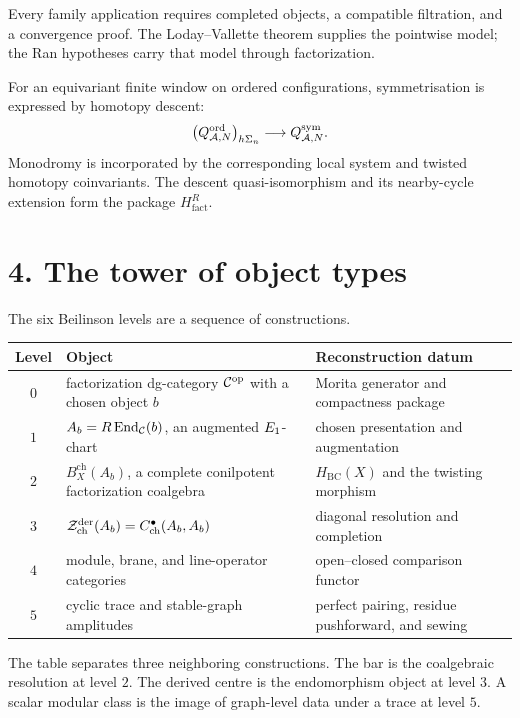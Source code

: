 Every family application requires completed objects, a compatible
filtration, and a convergence proof.  The
Loday--Vallette theorem supplies the pointwise model; the Ran
hypotheses carry that model through factorization.

For an equivariant finite window on ordered configurations,
symmetrisation is expressed by homotopy descent:
\[
 \bigl(Q^{\mathrm{ord}}_{\mathcal{A},N}\bigr)_{h\Sigma_n}
 \longrightarrow Q^{\mathrm{sym}}_{\mathcal{A},N}.
\]
Monodromy is incorporated by the corresponding local system and
twisted homotopy coinvariants.  The descent quasi-isomorphism and its
nearby-cycle extension form the package
\(H_{\mathrm{fact}}^R\).

\section*{4.  The tower of object types}

The six Beilinson levels are a sequence of constructions.
\begin{center}
\small
\renewcommand{\arraystretch}{1.25}
\begin{tabular}{@{}c p{} p{}@{}}
\textbf{Level} & \textbf{Object} & \textbf{Reconstruction datum}\\
\hline
\(0\) &
factorization dg-category \(\mathcal{C}^{\mathrm{op}}\) with a chosen object
\(b\) &
Morita generator and compactness package\\
\(1\) &
\(A_b=R\operatorname{End}_{\mathcal{C}}(b)\), an augmented
\(E_1\)-chart &
chosen presentation and augmentation\\
\(2\) &
\(B_X^{\mathrm{ch}}(A_b)\), a complete conilpotent
factorization coalgebra &
\(H_{\mathrm{BC}}(X)\) and the twisting morphism\\
\(3\) &
\(\mathcal{Z}_{\mathrm{ch}}^{\mathrm{der}}(A_b)
=C^\bullet_{\mathrm{ch}}(A_b,A_b)\) &
diagonal resolution and completion\\
\(4\) &
module, brane, and line-operator categories &
open--closed comparison functor\\
\(5\) &
cyclic trace and stable-graph amplitudes &
perfect pairing, residue pushforward, and sewing\\
\end{tabular}
\end{center}

The table separates three neighboring constructions.  The bar is the
coalgebraic resolution at level \(2\).  The derived centre is the
endomorphism object at level \(3\).  A scalar modular class is the
image of graph-level data under a trace at level \(5\).

